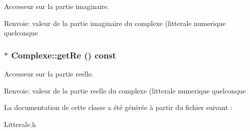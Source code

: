 Accesseur sur la partie imaginaire. 

\begin{Desc}
\item[Renvoie:]valeur de la partie imaginaire du complexe (litterale numerique quelconque \end{Desc}
\hypertarget{class_complexe_6485653e44cbffd188a219f9eb023311}{
\subsubsection[{getRe}]{$\ast$ Complexe::getRe () const}}
\label{class_complexe_6485653e44cbffd188a219f9eb023311}


Accesseur sur la partie reelle. 

\begin{Desc}
\item[Renvoie:]valeur de la partie reelle du complexe (litterale numerique quelconque \end{Desc}


La documentation de cette classe a été générée à partir du fichier suivant :\begin{CompactItemize}
\item 
Litterale.h\end{CompactItemize}

